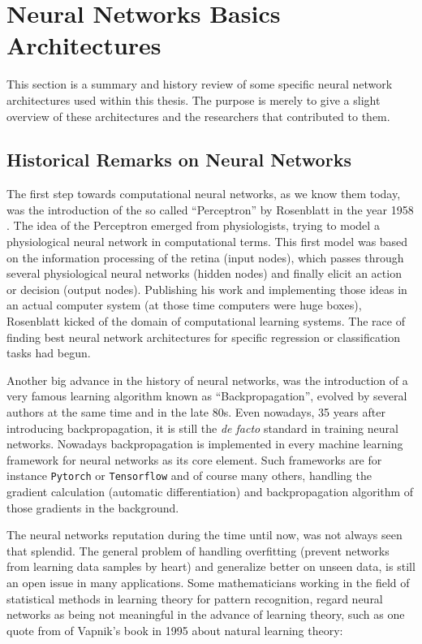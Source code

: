 
\section{Neural Networks Basics Architectures}\label{sec:prev_nn}
\thesisStateNotReady
This section is a summary and history review of some specific neural network architectures used within this thesis.
The purpose is merely to give a slight overview of these architectures and the researchers that contributed to them.


\subsection{Historical Remarks on Neural Networks}\label{sec:prev_nn_history}
The first step towards computational neural networks, as we know them today, was the introduction of the so called \enquote{Perceptron} by Rosenblatt in the year 1958 \cite{Rosenblatt1958}. 
The idea of the Perceptron emerged from physiologists, trying to model a physiological neural network in computational terms. 
This first model was based on the information processing of the retina (input nodes), which passes through several physiological neural networks (hidden nodes) and finally elicit an action or decision (output nodes).
Publishing his work and implementing those ideas in an actual computer system (at those time computers were huge boxes), Rosenblatt kicked of the domain of computational learning systems.
The race of finding best neural network architectures for specific regression or classification tasks had begun.

Another big advance in the history of neural networks, was the introduction of a very famous learning algorithm known as \enquote{Backpropagation}, evolved by several authors at the same time \cite{LeCun1986} and \cite{Rumelhart1986} in the late 80s. 
Even nowadays, 35 years after introducing backpropagation, it is still the \emph{de facto} standard in training neural networks.
Nowadays backpropagation is implemented in every machine learning framework for neural networks as its core element.
Such frameworks are for instance \texttt{Pytorch} \cite{Pytorch} or \texttt{Tensorflow} \cite{Tensorflow} and of course many others, handling the gradient calculation (automatic differentiation) and backpropagation algorithm of those gradients in the background.

The neural networks reputation during the time until now, was not always seen that splendid.
The general problem of handling overfitting (prevent networks from learning data samples by heart) and generalize better on unseen data, is still an open issue in many applications.
Some mathematicians working in the field of statistical methods in learning theory for pattern recognition, regard neural networks as being not meaningful in the advance of learning theory, such as one quote from \cite{Vapnik1995} of Vapnik's book in 1995 about natural learning theory:

